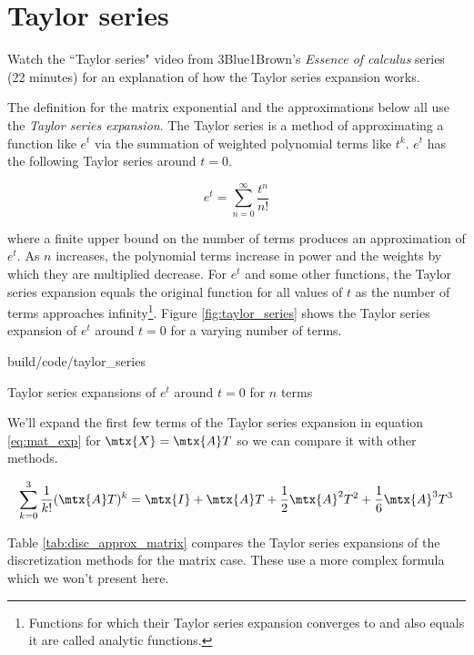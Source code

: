 \section{Taylor series}

\begin{remark}
  Watch the ``Taylor series" video from 3Blue1Brown's \textit{Essence of
  calculus} series (22 minutes) \cite{bib:calculus_taylor_series} for an
  explanation of how the Taylor series expansion works.
\end{remark}

The definition for the matrix exponential and the approximations below all use
the \textit{Taylor series expansion}. The Taylor series is a method of
approximating a function like $e^t$ via the summation of weighted polynomial
terms like $t^k$. $e^t$ has the following Taylor series around $t = 0$.

\begin{equation*}
  e^t = \sum_{n = 0}^\infty \frac{t^n}{n!}
\end{equation*}

where a finite upper bound on the number of terms produces an approximation of
$e^t$. As $n$ increases, the polynomial terms increase in power and the weights
by which they are multiplied decrease. For $e^t$ and some other functions, the
Taylor series expansion equals the original function for all values of $t$ as
the number of terms approaches infinity\footnote{Functions for which their
Taylor series expansion converges to and also equals it are called analytic
functions.}. Figure \ref{fig:taylor_series} shows the Taylor series expansion of
$e^t$ around $t = 0$ for a varying number of terms.

\begin{svg}{build/code/taylor_series}
  \caption{Taylor series expansions of $e^t$ around $t = 0$ for $n$ terms}
  \label{fig:taylor_series}
\end{svg}

We'll expand the first few terms of the Taylor series expansion in equation
\eqref{eq:mat_exp} for $\mtx{X} = \mtx{A}T$ so we can compare it with other
methods.

\begin{equation*}
  \sum_{k=0}^3 \frac{1}{k!} (\mtx{A}T)^k = \mtx{I} + \mtx{A}T +
    \frac{1}{2}\mtx{A}^2T^2 + \frac{1}{6}\mtx{A}^3T^3
\end{equation*}

Table \ref{tab:disc_approx_matrix} compares the Taylor series expansions of the
\gls{discretization} methods for the matrix case. These use a more complex
formula which we won't present here.


